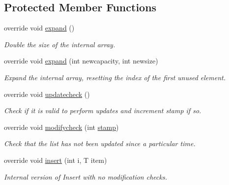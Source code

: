 \subsection*{Protected Member Functions}
\begin{DoxyCompactItemize}
\item 
override void \hyperlink{class_c5_1_1_array_list_a048d68f4ca0b66dbc9976c957b75d545}{expand} ()
\begin{DoxyCompactList}\small\item\em Double the size of the internal array. \end{DoxyCompactList}\item 
override void \hyperlink{class_c5_1_1_array_list_a08932223ebb743866c92756cbdee059b}{expand} (int newcapacity, int newsize)
\begin{DoxyCompactList}\small\item\em Expand the internal array, resetting the index of the first unused element. \end{DoxyCompactList}\item 
override void \hyperlink{class_c5_1_1_array_list_a3d2755c3b8fdd5fc8d4b7b435a2002ff}{updatecheck} ()
\begin{DoxyCompactList}\small\item\em Check if it is valid to perform updates and increment stamp if so. \end{DoxyCompactList}\item 
override void \hyperlink{class_c5_1_1_array_list_a1ab3f3702bc6ac270a421479e90437dd}{modifycheck} (int \hyperlink{class_c5_1_1_collection_base_ae13bd5b482306a49a4d10654a9b8b064}{stamp})
\begin{DoxyCompactList}\small\item\em Check that the list has not been updated since a particular time. \end{DoxyCompactList}\item 
override void \hyperlink{class_c5_1_1_array_list_aadbaf3c60c27cd68711d9f0098e02ca0}{insert} (int i, T item)
\begin{DoxyCompactList}\small\item\em Internal version of Insert with no modification checks. \end{DoxyCompactList}\end{DoxyCompactItemize}

